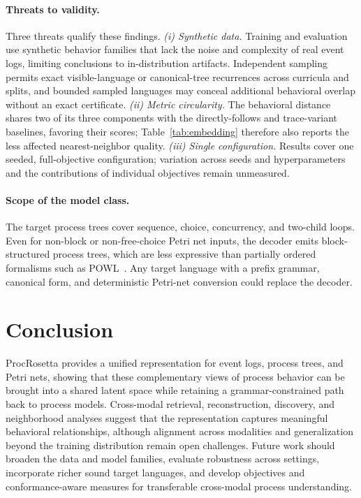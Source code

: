\documentclass[manuscript,screen,nonacm]{acmart}
\begin{document}
\paragraph{Threats to validity.}
Three threats qualify these findings. \emph{(i) Synthetic data.} Training and evaluation use synthetic behavior families that lack the noise and complexity of real event logs, limiting conclusions to in-distribution artifacts. Independent sampling permits exact visible-language or canonical-tree recurrences across curricula and splits, and bounded sampled languages may conceal additional behavioral overlap without an exact certificate. \emph{(ii) Metric circularity.} The behavioral distance shares two of its three components with the directly-follows and trace-variant baselines, favoring their scores; Table~\ref{tab:embedding} therefore also reports the less affected nearest-neighbor quality. \emph{(iii) Single configuration.} Results cover one seeded, full-objective configuration; variation across seeds and hyperparameters and the contributions of individual objectives remain unmeasured.

\paragraph{Scope of the model class.}
The target process trees cover sequence, choice, concurrency, and two-child loops. Even for non-block or non-free-choice Petri net inputs, the decoder emits block-structured process trees, which are less expressive than partially ordered formalisms such as POWL~\cite{Kourani2026}. Any target language with a prefix grammar, canonical form, and deterministic Petri-net conversion could replace the decoder.

\section{Conclusion}
\label{sec:conclusion}

ProcRosetta provides a unified representation for event logs, process trees, and Petri nets, showing that these complementary views of process behavior can be brought into a shared latent space while retaining a grammar-constrained path back to process models. Cross-modal retrieval, reconstruction, discovery, and neighborhood analyses suggest that the representation captures meaningful behavioral relationships, although alignment across modalities and generalization beyond the training distribution remain open challenges. Future work should broaden the data and model families, evaluate robustness across settings, incorporate richer sound target languages, and develop objectives and conformance-aware measures for transferable cross-modal process understanding.
\end{document}
